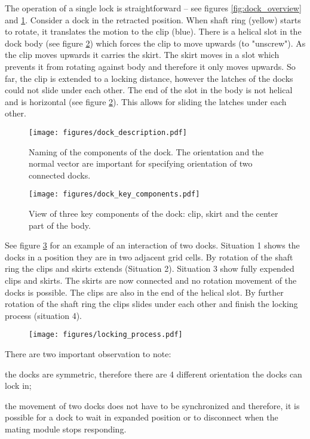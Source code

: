 The operation of a single lock is straightforward -- see figures
\ref{fig:dock_overview} and \ref{fig:dock_description}. Consider a dock in the
retracted position. When shaft ring (yellow) starts to rotate, it translates the
motion to the clip (blue). There is a helical slot in the dock body (see figure
\ref{fig:dock_key_components}) which forces the clip to move upwards (to
"unscrew"). As the clip moves upwards it carries the skirt. The skirt moves in a
slot which prevents it from rotating against body and therefore it only moves
upwards. So far, the clip is extended to a locking distance, however the latches
of the docks could not slide under each other. The end of the slot in the body
is not helical and is horizontal (see figure \ref{fig:dock_key_components}).
This allows for sliding the latches under each other.

\begin{figure}
    \centering
    \texttt{[image: figures/dock\_description.pdf]}
    \caption{Naming of the components of the dock. The orientation and the
    normal vector are important for specifying orientation of two connected
    docks. }
    \label{fig:dock_description}
\end{figure}

\begin{figure}
    \centering
    \texttt{[image: figures/dock\_key\_components.pdf]}
    \caption{View of three key components of the dock: clip, skirt and the
    center part of the body.}
    \label{fig:dock_key_components}
\end{figure}

See figure \ref{fig:dock_locking_process} for an example of an interaction of
two docks. Situation 1 shows the docks in a position they are in two adjacent
grid cells. By rotation of the shaft ring the clips and skirts extends
(Situation 2). Situation 3 show fully expended clips and skirts. The skirts are
now connected and no rotation movement of the docks is possible. The clips are
also in the end of the helical slot. By further rotation of the shaft ring the
clips slides under each other and finish the locking process (situation 4).

\begin{figure}
    \centering
    \texttt{[image: figures/locking\_process.pdf]}
    \caption{}
    \label{fig:dock_locking_process}
\end{figure}

There are two important observation to note:
\begin{enumerate*}
    \item the docks are symmetric, therefore there are 4 different orientation
    the docks can lock in;
    \item the movement of two docks does not have to be synchronized and
    therefore, it is possible for a dock to wait in expanded position or to
    disconnect when the mating module stops responding.
\end{enumerate*}


